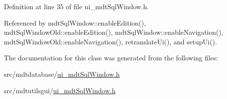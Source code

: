 Definition at line 35 of file ui\-\_\-mdt\-Sql\-Window.\-h.



Referenced by mdt\-Sql\-Window\-::enable\-Edition(), mdt\-Sql\-Window\-Old\-::enable\-Edition(), mdt\-Sql\-Window\-::enable\-Navigation(), mdt\-Sql\-Window\-Old\-::enable\-Navigation(), retranslate\-Ui(), and setup\-Ui().



The documentation for this class was generated from the following files\-:\begin{DoxyCompactItemize}
\item 
src/mdtdatabase/\hyperlink{mdtdatabase_2ui__mdt_sql_window_8h}{ui\-\_\-mdt\-Sql\-Window.\-h}\item 
src/mdtutilsgui/\hyperlink{mdtutilsgui_2ui__mdt_sql_window_8h}{ui\-\_\-mdt\-Sql\-Window.\-h}\end{DoxyCompactItemize}
